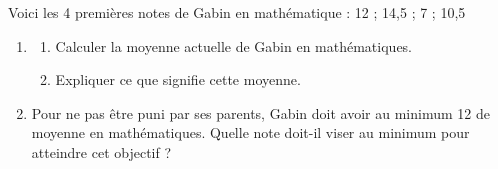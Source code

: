\begin{exercicebox}
Voici les 4 premières notes de Gabin en mathématique : 12 ; 14,5 ; 7 ; 10,5
\begin{enumerate}
    \item 
    \begin{enumerate}
        \item Calculer la moyenne actuelle de Gabin en mathématiques.
        \item Expliquer ce que signifie cette moyenne.
    \end{enumerate}
    \item Pour ne pas être puni par ses parents, Gabin doit avoir au minimum 12 de moyenne
    en mathématiques. Quelle note doit-il viser au minimum pour atteindre cet objectif ?
    \end{enumerate}
\end{exercicebox}
